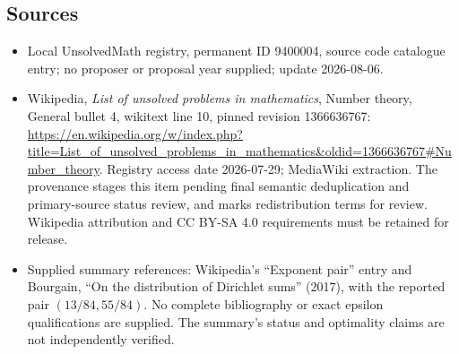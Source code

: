 \documentclass[11pt]{article}
\begin{document}
\subsection{Sources}
\begin{itemize}
\item Local UnsolvedMath registry, permanent ID 9400004, source code catalogue entry; no proposer or proposal year supplied; update 2026-08-06.
\item Wikipedia, \emph{List of unsolved problems in mathematics}, Number theory, General bullet 4, wikitext line 10, pinned revision 1366636767: \url{https://en.wikipedia.org/w/index.php?title=List_of_unsolved_problems_in_mathematics&oldid=1366636767#Number_theory}. Registry access date 2026-07-29; MediaWiki extraction. The provenance stages this item pending final semantic deduplication and primary-source status review, and marks redistribution terms for review. Wikipedia attribution and CC BY-SA 4.0 requirements must be retained for release.
\item Supplied summary references: Wikipedia's ``Exponent pair'' entry and Bourgain, ``On the distribution of Dirichlet sums'' (2017), with the reported pair \((13/84,55/84)\). No complete bibliography or exact epsilon qualifications are supplied. The summary's status and optimality claims are not independently verified.
\end{itemize}
\end{document}
